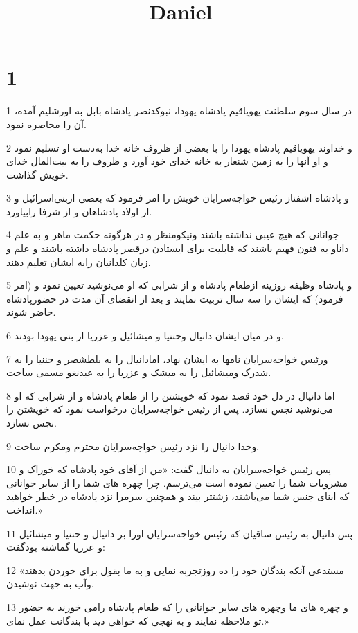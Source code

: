 

\title{Daniel}


\chapter{1}

\par 1 در سال سوم سلطنت یهویاقیم پادشاه یهودا، نبوکدنصر پادشاه بابل به اورشلیم آمده، آن را محاصره نمود.
\par 2 و خداوند یهویاقیم پادشاه یهودا را با بعضی از ظروف خانه خدا به‌دست او تسلیم نمود و او آنها را به زمین شنعار به خانه خدای خود آورد و ظروف را به بیت‌المال خدای خویش گذاشت.
\par 3 و پادشاه اشفناز رئیس خواجه‌سرایان خویش را امر فرمود که بعضی ازبنی‌اسرائیل و از اولاد پادشاهان و از شرفا رابیاورد.
\par 4 جوانانی که هیچ عیبی نداشته باشند ونیکومنظر و در هرگونه حکمت ماهر و به علم داناو به فنون فهیم باشند که قابلیت برای ایستادن درقصر پادشاه داشته باشند و علم و زبان کلدانیان رابه ایشان تعلیم دهند.
\par 5 و پادشاه وظیفه روزینه ازطعام پادشاه و از شرابی که او می‌نوشید تعیین نمود و (امر فرمود) که ایشان را سه سال تربیت نمایند و بعد از انقضای آن مدت در حضورپادشاه حاضر شوند.
\par 6 و در میان ایشان دانیال وحننیا و میشائیل و عزریا از بنی یهودا بودند.
\par 7 ورئیس خواجه‌سرایان نامها به ایشان نهاد، امادانیال را به بلطشصر و حننیا را به شدرک ومیشائیل را به میشک و عزریا را به عبدنغو مسمی ساخت.
\par 8 اما دانیال در دل خود قصد نمود که خویشتن را از طعام پادشاه و از شرابی که او می‌نوشید نجس نسازد. پس از رئیس خواجه‌سرایان درخواست نمود که خویشتن را نجس نسازد.
\par 9 وخدا دانیال را نزد رئیس خواجه‌سرایان محترم ومکرم ساخت.
\par 10 پس رئیس خواجه‌سرایان به دانیال گفت: «من از آقای خود پادشاه که خوراک و مشروبات شما را تعیین نموده است می‌ترسم. چرا چهره های شما را از سایر جوانانی که ابنای جنس شما می‌باشند، زشتتر بیند و همچنین سرمرا نزد پادشاه در خطر خواهید انداخت.»
\par 11 پس دانیال به رئیس ساقیان که رئیس خواجه‌سرایان اورا بر دانیال و حننیا و میشائیل و عزریا گماشته بودگفت:
\par 12 «مستدعی آنکه بندگان خود را ده روزتجربه نمایی و به ما بقول برای خوردن بدهند وآب به جهت نوشیدن.
\par 13 و چهره های ما وچهره های سایر جوانانی را که طعام پادشاه رامی خورند به حضور تو ملاحظه نمایند و به نهجی که خواهی دید با بندگانت عمل نمای.»
